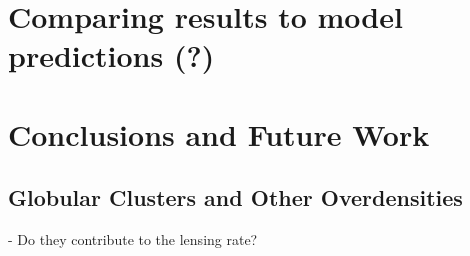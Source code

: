 \documentclass[12pt,preprint]{aastex}
\begin{document}
\section{Comparing results to model predictions (?)}

\section{Conclusions and Future Work}
\subsection{Globular Clusters and Other Overdensities}
- Do they contribute to the lensing rate?

%
%
%
%
%
%
\end{document}
